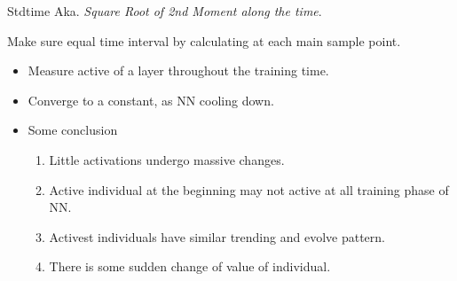 \documentclass[notes]{beamer}
\newcommand{\qihao}{\fontsize{5.25pt}{\baselineskip}\selectfont}    %
\begin{document}
\begin{frame}{Stdtime} 	
Aka. \emph{Square Root of 2nd Moment along the time}. 

Make sure equal time interval by calculating at  each \alert{main sample point}.

\begin{itemize}
\item Measure active of a layer throughout the training time. 
\item Converge to a constant, as NN cooling down.
\item Some conclusion \begin{enumerate}
\item Little activations undergo massive changes.
\item Active individual at the beginning may not active at all training phase of NN. 
\item Activest individuals have similar trending and evolve pattern. 
\item There is some sudden change of value of individual. 
\end{enumerate}
\end{itemize}
\end{frame}
\end{document}
